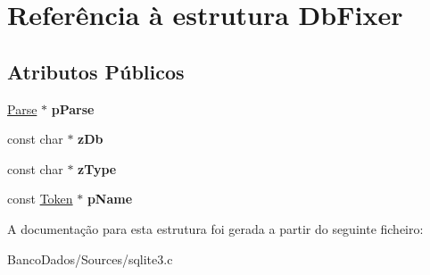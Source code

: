 \hypertarget{struct_db_fixer}{\section{Referência à estrutura Db\-Fixer}
\label{struct_db_fixer}
}
\subsection*{Atributos Públicos}
\begin{DoxyCompactItemize}
\item 
\hypertarget{struct_db_fixer_ac5c9b8bca3b05a66faea11dd998bf6f6}{\hyperlink{struct_parse}{Parse} $\ast$ {\bfseries p\-Parse}}\label{struct_db_fixer_ac5c9b8bca3b05a66faea11dd998bf6f6}

\item 
\hypertarget{struct_db_fixer_aba91df5965a99915d9180805d02c4a7f}{const char $\ast$ {\bfseries z\-Db}}\label{struct_db_fixer_aba91df5965a99915d9180805d02c4a7f}

\item 
\hypertarget{struct_db_fixer_ae4748d9e97560b7b332527434408c2e8}{const char $\ast$ {\bfseries z\-Type}}\label{struct_db_fixer_ae4748d9e97560b7b332527434408c2e8}

\item 
\hypertarget{struct_db_fixer_aedee20e10de7337651b84656ee81b39c}{const \hyperlink{struct_token}{Token} $\ast$ {\bfseries p\-Name}}\label{struct_db_fixer_aedee20e10de7337651b84656ee81b39c}

\end{DoxyCompactItemize}


A documentação para esta estrutura foi gerada a partir do seguinte ficheiro\-:\begin{DoxyCompactItemize}
\item 
Banco\-Dados/\-Sources/sqlite3.\-c\end{DoxyCompactItemize}
